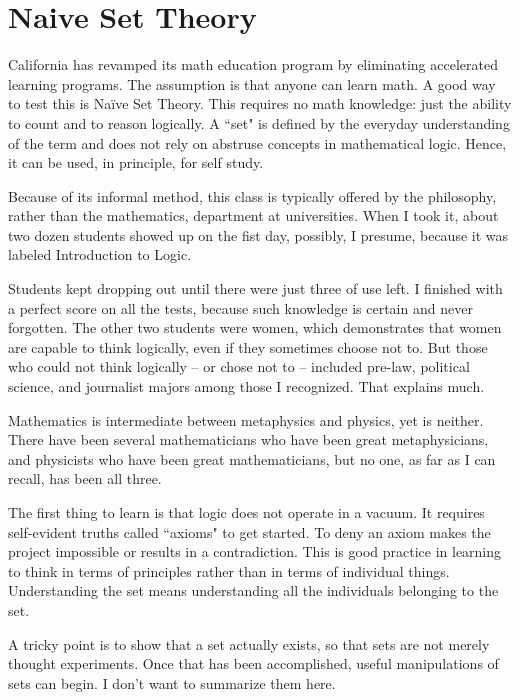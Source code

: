 \section{Naive Set Theory}

California has revamped its math education program by eliminating accelerated learning programs. The assumption is that anyone can learn math. A good way to test this is Naïve Set Theory. This requires no math knowledge: just the ability to count and to reason logically. A ``set" is defined by the everyday understanding of the term and does not rely on abstruse concepts in mathematical logic. Hence, it can be used, in principle, for self study.

Because of its informal method, this class is typically offered by the philosophy, rather than the mathematics, department at universities. When I took it, about two dozen students showed up on the fist day, possibly, I presume, because it was labeled Introduction to Logic.

Students kept dropping out until there were just three of use left. I finished with a perfect score on all the tests, because such knowledge is certain and never forgotten. The other two students were women, which demonstrates that women are capable to think logically, even if they sometimes choose not to. But those who could not think logically – or chose not to – included pre-law, political science, and journalist majors among those I recognized. That explains much.

Mathematics is intermediate between metaphysics and physics, yet is neither. There have been several mathematicians who have been great metaphysicians, and physicists who have been great mathematicians, but no one, as far as I can recall, has been all three.

The first thing to learn is that logic does not operate in a vacuum. It requires self-evident truths called ``axioms" to get started. To deny an axiom makes the project impossible or results in a contradiction. This is good practice in learning to think in terms of principles rather than in terms of individual things. Understanding the set means understanding all the individuals belonging to the set.

A tricky point is to show that a set actually exists, so that sets are not merely thought experiments. Once that has been accomplished, useful manipulations of sets can begin. I don't want to summarize them here.

